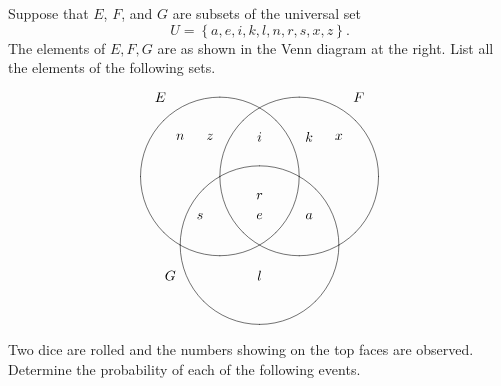\documentclass[answers,addpoints,12pt]{exam}
\begin{document}
\begin{questions}

\begin{multicols}{2}
\question[12]
Suppose that $E$, $F$, and $G$ are subsets
of the universal set
\[U=\left\{a,e,i,k,l,n,r,s,x,z\right\}.\]
The elements of
$E,F,G$ are as shown in the Venn diagram
at the right.
List all the elements of the following sets.
\[\begin{xy}<1cm,0cm>:
(-2.5,2)*{E};
(2.5,2)*{F};
(-2.25,-2.5)*{G};
(-1,0)*\cir<2cm>{};
(1,0)*\cir<2cm>{};
(0,-1.732)*\cir<2cm>{};
(-2,1)*{n};
(-1.25,1)*{z};
(-1.5,-1)*{s};
(0,1)*{i};
(0,-.5)*{r};
(0,-1)*{e};
(1.25,1)*{k};
(1.25,-1)*{a};
(2,1)*{x};
(0,-2.5)*{l};
\end{xy}\]
\end{multicols}
\ifprintanswers\else\newpage\fi

\question[24] Two dice are rolled and the
numbers showing on the top faces are observed.
Determine the probability of each of the following events.
\end{questions}
\end{document}
